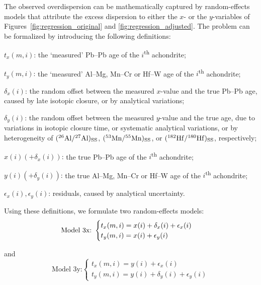 The observed overdispersion can be mathematically captured by
random-effects models that attribute the excess dispersion to either
the $x$- or the $y$-variables of Figures~\ref{fig:regression_original}
and \ref{fig:regression_adjusted}.  The problem can be formalized by
introducing the following definitions:
\begin{description}
  \item{$t_x(m,i)$:} the `measured' Pb--Pb age of the
    $i$\textsuperscript{th} achondrite;
  \item{$t_y(m,i)$:} the `measured' Al--Mg, Mn--Cr or Hf--W age of the
    $i$\textsuperscript{th} achondrite;
    \item{$\delta_x(i)$:} the random offset between the measured
      $x$-value and the true Pb--Pb age, caused by late isotopic
      closure, or by analytical variations;
    \item{$\delta_y(i)$:} the random offset between the measured
      $y$-value and the true age, due to variations in isotopic
      closure time, or systematic analytical variations, or by
      heterogeneity of $(\mbox{${}^{26}{\rm Al}/{}^{27}{\rm Al}$})_{\rm SS}$, $(\mbox{${}^{53}{\rm Mn}/{}^{55}{\rm Mn}$})_{\rm SS}$,
      or $(\mbox{${}^{182}{\rm Hf}/{}^{180}{\rm Hf}$})_{\rm SS}$, respectively;
  \item{$x(i) (+ \delta_x(i))$:} the true Pb--Pb age of the
    $i$\textsuperscript{th} achondrite;
  \item{$y(i) (+ \delta_y(i))$:} the true Al--Mg, Mn--Cr or Hf--W age
    of the $i$\textsuperscript{th} achondrite;
  \item{$\epsilon_x(i), \epsilon_y(i)$:} residuals, caused by
    analytical uncertainty.
\end{description}

Using these definitions, we formulate two random-effects models:
\begin{equation}
  \mbox{Model~3x:~}
  \begin{cases}
    t_{x}(m,i) = x(i) + \delta_x(i) + \epsilon_x(i) \\
    t_{y}(m,i) = x(i) + \epsilon_y(i)
  \end{cases}\\
\end{equation}

\noinden and
\begin{equation}
  \mbox{Model~3y:}
  \begin{cases}
    t_{x}(m,i) = y(i) + \epsilon_x(i) \\
    t_{y}(m,i) = y(i) + \delta_y(i) + \epsilon_y(i)
  \end{cases}
  \label{eq:model3xy}
\end{equation}

